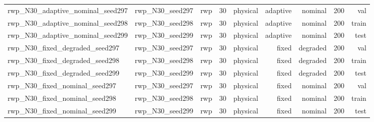 \begin{tabular}{lrrrrrrrr}
rwp\_N30\_adaptive\_nominal\_seed297 & rwp\_N30\_seed297 & rwp & 30 & physical & adaptive & nominal & 200 & val \\
rwp\_N30\_adaptive\_nominal\_seed298 & rwp\_N30\_seed298 & rwp & 30 & physical & adaptive & nominal & 200 & train \\
rwp\_N30\_adaptive\_nominal\_seed299 & rwp\_N30\_seed299 & rwp & 30 & physical & adaptive & nominal & 200 & test \\
rwp\_N30\_fixed\_degraded\_seed297 & rwp\_N30\_seed297 & rwp & 30 & physical & fixed & degraded & 200 & val \\
rwp\_N30\_fixed\_degraded\_seed298 & rwp\_N30\_seed298 & rwp & 30 & physical & fixed & degraded & 200 & train \\
rwp\_N30\_fixed\_degraded\_seed299 & rwp\_N30\_seed299 & rwp & 30 & physical & fixed & degraded & 200 & test \\
rwp\_N30\_fixed\_nominal\_seed297 & rwp\_N30\_seed297 & rwp & 30 & physical & fixed & nominal & 200 & val \\
rwp\_N30\_fixed\_nominal\_seed298 & rwp\_N30\_seed298 & rwp & 30 & physical & fixed & nominal & 200 & train \\
rwp\_N30\_fixed\_nominal\_seed299 & rwp\_N30\_seed299 & rwp & 30 & physical & fixed & nominal & 200 & test \\
\bottomrule
\end{tabular}